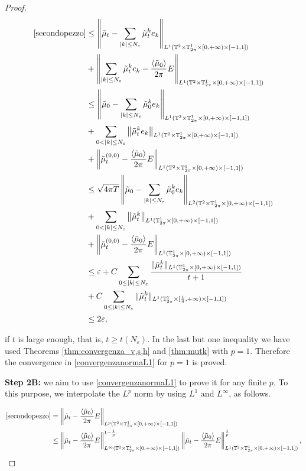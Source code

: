 \documentclass[a4paper,10pt,reqno]{amsart}
\numberwithin{equation}{subsection}
\numberwithin{figure}{subsection}
\begin{document}
\begin{proof}
\begin{align*}
\eqref{secondopezzo}&\leq\left\|\tilde\mu_t-\sum_{|k|\leq N_{\varepsilon}}\tilde\mu_t^ke_k\right\|_{L^1(\mathbb{T}^2\times\mathbb{T}^1_{2\pi}\times[0,+\infty)\times[-1,1])}
\\
&+\left\|\sum_{|k|\leq N_{\varepsilon}}\tilde\mu_t^ke_k-\frac{\langle\tilde\mu_0\rangle}{2\pi}E\right\|_{L^1(\mathbb{T}^2\times\mathbb{T}^1_{2\pi}\times[0,+\infty)\times[-1,1])}
\\
&\leq\left\|\tilde\mu_0-\sum_{|k|\leq N_{\varepsilon}}\tilde\mu_0^ke_k\right\|_{L^1(\mathbb{T}^2\times\mathbb{T}^1_{2\pi}\times[0,+\infty)\times[-1,1])}
\\
&+\sum_{0<|k|\leq N_{\varepsilon}}\left\|\tilde\mu_t^ke_k\right\|_{L^1(\mathbb{T}^2\times\mathbb{T}^1_{2\pi}\times[0,+\infty)\times[-1,1])}
\\
&+\left\|\tilde\mu_t^{(0,0)}-\frac{\langle\tilde\mu_0\rangle}{2\pi}E\right\|_{L^1(\mathbb{T}^2\times\mathbb{T}^1_{2\pi}\times[0,+\infty)\times[-1,1])}
\\
&\leq\sqrt{4\pi T}\left\|\tilde\mu_0-\sum_{|k|\leq N_{\varepsilon}}\tilde\mu_0^ke_k\right\|_{L^2(\mathbb{T}^2\times\mathbb{T}^1_{2\pi}\times[0,+\infty)\times[-1,1])}
\\
&+\sum_{0<|k|\leq N_{\varepsilon}}\left\|\tilde\mu_t^k\right\|_{L^1(\mathbb{T}^1_{2\pi}\times[0,+\infty)\times[-1,1])}
\\
&+\left\|\tilde\mu_t^{(0,0)}-\frac{\langle\tilde\mu_0\rangle}{2\pi}E\right\|_{L^1(\mathbb{T}^1_{2\pi}\times[0,+\infty)\times[-1,1])}
\\
&\leq\varepsilon+C\sum_{0\leq|k|\leq N_{\varepsilon}}\frac{\|\tilde\mu_t^k\|_{L^1(\mathbb{T}^1_{2\pi}\times[0,+\infty)\times[-1,1])}}{t+1}
\\
&+C\sum_{0\leq|k|\leq N_{\varepsilon}}\|\tilde\mu_t^k\|_{L^1(\mathbb{T}^1_{2\pi}\times[\frac{t}{4},+\infty)\times[-1,1])}
\\
&\leq2\varepsilon,
\end{align*}

if $t$ is large enough, that is, $t\geq t(N_{\varepsilon})$. In the last but one inequality we have used Theorems \ref{thm:convergenza_v,s,h} and \ref{thm:mutk} with $p=1$. Therefore the convergence in \eqref{convergenzanormaL1} for $p=1$ is proved.

\textbf{Step 2B: } we aim to use \eqref{convergenzanormaL1} to prove it for any finite $p$. To this purpose, we interpolate the $L^p$ norm by using $L^1$ and $L^{\infty}$, as follows.

{\small\begin{align*}
\eqref{secondopezzo}&=\left\|\tilde\mu_t-\frac{\langle\tilde\mu_0\rangle}{2\pi}E\right\|_{L^p(\mathbb{T}^2\times\mathbb{T}^1_{2\pi}\times[0,+\infty)\times[-1,1])}
\\
&\leq\left\|\tilde\mu_t-\frac{\langle\tilde\mu_0\rangle}{2\pi}E\right\|_{L^{\infty}(\mathbb{T}^2\times\mathbb{T}^1_{2\pi}\times[0,+\infty)\times[-1,1])}^{1-\frac{1}{p}}\left\|\tilde\mu_t-\frac{\langle\tilde\mu_0\rangle}{2\pi}E\right\|_{L^1(\mathbb{T}^2\times\mathbb{T}^1_{2\pi}\times[0,+\infty)\times[-1,1])}^{\frac{1}{p}},
\end{align*}}


\end{proof}
\end{document}
